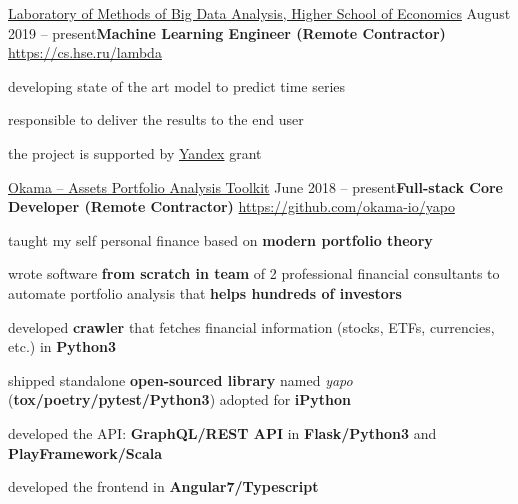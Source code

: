 \documentclass{resume} %
\begin{document}


\begin{samepage}
\begin{rSubsection}{\href{https://cs.hse.ru/lambda}
{Laboratory of Methods of Big Data Analysis, Higher School of Economics}}
{August 2019 -- present}{\textbf{Machine Learning Engineer (Remote Contractor)}}
{\href{https://cs.hse.ru/lambda/}{https://cs.hse.ru/lambda}}
\item developing state of the art model to predict time series
\item responsible to deliver the results to the end user
\item the project is supported by \href{http://yandex.ru}{Yandex} grant
\end{rSubsection}
\end{samepage}

\begin{samepage}
\begin{rSubsection}{\href{https://github.com/okama-io/yapo}
{Okama -- Assets Portfolio Analysis Toolkit}}
{June 2018 -- present}{\textbf{Full-stack Core Developer (Remote Contractor)}}
{\href{https://github.com/okama-io/yapo}{https://github.com/okama-io/yapo}}
\item taught my self personal finance based on \textbf{modern portfolio theory} 
\item wrote software \textbf{from scratch in team} of 2 professional financial consultants to automate portfolio analysis that \textbf{helps hundreds of investors}
\item developed \textbf{crawler} that fetches financial information (stocks, ETFs, currencies, etc.) in \textbf{Python3}
\item shipped standalone \textbf{open-sourced library} named \textit{yapo} (\textbf{tox/poetry/pytest/Python3}) adopted
for \textbf{iPython}
\item developed the API: \textbf{GraphQL/REST API} in \textbf{Flask/Python3} and \textbf{PlayFramework/Scala}
\item developed the frontend in \textbf{Angular7/Typescript}
\end{rSubsection}
\end{samepage}
\end{document}
